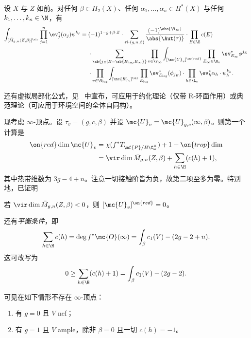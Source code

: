 \begin{thm}
    设 \(X\) 与 \(Z\) 如前。对任何 \(\beta \in H_2(X)\)、任何 \(\alpha_1, \ldots, \alpha_n \in H^*(X)\) 与任何 \(k_1, \ldots, k_n \in \N\)，有
    \begin{align*}
        \int_{[\bar{M}_{g,n}(Z,\beta)]^{\vir}} \prod_{j=1}^n \ev_j^* (\alpha_j) \psi^{k_j}={}& (-1)^{1-g+\beta \cdot Z} \cdot \sum_{\tau \vdash (g,n,\beta)} \frac{(-1)^{\abs{\V_{\infty}}}}{\abs{\Aut(\tau)}} \cdot \prod_{E \in \E} c(E) \\
        & \cdot \sum_{\ab\{j_E \mid E = \ab\{E_{\log}, E_{\infty}\}\}}  \prod_{v \in \V_{\infty}} \int_{[\mc{U}_v]^{\on{red}}} \prod_{E_{\infty} \in \H_v} \ev_{E_{\infty}}^* \phi^{j_E}  \\
        &  \cdot \prod_{v \in \V_{\log}} \int_{[\mc{R}_v]^{\vir}} \prod_{E_{\log}} \ev_{E_{\log}}^* (\phi_{j_E}) \cdot \prod_{h \in \L_v} \ev_h^* \alpha_h \cdot \psi_h^{k_h} .
    \end{align*}
\end{thm}

\begin{rmk}
    还有虚拟局部化公式，见~\cite{CJRlocalization} 中宣布，可应用于约化理论（仅带 R-环面作用）或典范理论（可应用于环境空间的全体自同构）。
\end{rmk}

现考虑 \(\infty\)-顶点。设 \(\tau_v = (g, c, \beta)\) 并设 \(\mc{U}_v = \mc{U}_{g,c}(\infty, \beta)\)。则第一个计算是
\begin{align*}
    \on{red}\dim \mc{U}_v &= \chi(f^* T_{\mf{P}/B \C^{\times}_{\omega}}) + 1 + \on{trop}\dim  \\
    &= \vir\dim \bar{M}_{g,n}(Z, \beta) + \sum_{h \in \H } (c(h) + 1),
\end{align*}
其中热带维数为 \(3g-4+n\)。注意一切接触阶皆为负，故第二项至多为零。特别地，已证明
\begin{cor}
    若 \(\vir\dim \bar{M}_{g,n}(Z,\beta) < 0\)，则 \([\mc{U}_v]^{\on{red}} = 0\)。
\end{cor}
还有\textit{平衡条件}，即
\begin{equation}\label{eqn:balancing condition}
    \sum_{h \in \H} c(h) = \deg f^* \mc{O}(\infty) = \int_{\beta} c_1(V) - (2g-2+n).
\end{equation}
这可改写为
\[ 0 \geq \sum_{h \in \H} (c(h)+1) = \int_{\beta} c_1(V) - (2g-2). \]
\begin{prop}
    可见在如下情形不存在 \(\infty\)-顶点：
    \begin{enumerate}
        \item 有 \(g = 0\) 且 \(V\) nef；
        \item 有 \(g=1\) 且 \(V\) ample，除非 \(\beta = 0\) 且一切 \(c(h) = -1\)。
    \end{enumerate}
\end{prop}


